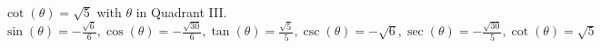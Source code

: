 {$\cot(\theta) = \sqrt{5}$ with $\theta$ in Quadrant III. }
{$\sin(\theta) = -\frac{\sqrt{6}}{6}, \cos(\theta) = -\frac{\sqrt{30}}{6}, \tan(\theta) = \frac{\sqrt{5}}{5}, \csc(\theta) = -\sqrt{6}, \sec(\theta) = -\frac{\sqrt{30}}{5}, \cot(\theta) = \sqrt{5}$}